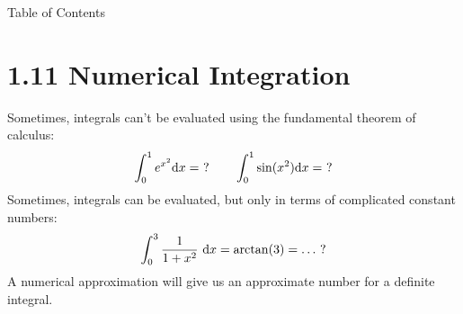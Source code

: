 \newcommand{\f}[1]{
	\SIN{#1}{\sx}
	\DIVIDE{#1}{2}{\hx}%
	\ADD{\hx}{\sx}{\fx}
	}



 \begin{frame}{Table of Contents }
\mapofcontentsA{\ak,\atool}
 \end{frame}

\section{1.11  Numerical Integration}

\begin{frame}[t]
Sometimes, integrals can't be evaluated using the fundamental theorem of calculus:
\[\int_0^1 e^{x^2}\text{d} x=\ ? \qquad \int_0^1 \sin(x^2)\text{d} x=\ ?\]\pause\vfill
Sometimes, integrals can be evaluated, but only in terms of complicated constant numbers:
\[\int_0^3 \frac{1}{1+x^2}\ \text{d} x=\arctan (3)=\ldots \ ?\]
\pause\vfill
A \alert{numerical approximation} will give us an approximate \alert{number} for a definite integral.
\end{frame}


